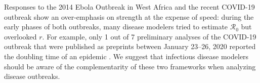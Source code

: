 \documentclass[12pt]{article}
\begin{document}
Responses to the 2014 Ebola Outbreak in West Africa and the recent COVID-19 outbreak show an over-emphasis on strength at the expense of speed:   
during the early phases of both outbreaks, many disease modelers tried to estimate $\mathcal R_0$ but overlooked $r$.
For example, only 1 out of 7 preliminary analyses of the COVID-19 outbreak that were published as preprints between January 23--26, 2020 reported the doubling time of an epidemic \citep{bedfordncov, imaincov, liuncov, majumderncov, readncov, riouncov, zhaoncov}.
We suggest that infectious disease modelers should be aware of the complementarity of these two frameworks when analyzing disease outbreaks.


\end{document}
